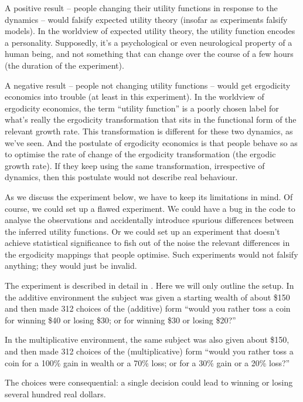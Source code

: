 A positive result -- people changing their utility functions in response to the dynamics -- would falsify 
expected utility theory (insofar as experiments falsify models). In the worldview of expected 
utility theory, the utility function encodes a personality. Supposedly, it's a psychological or 
even neurological property of a human being, and not something that can change over the 
course of a few hours (the duration of the experiment). 

A negative result -- people not changing utility functions -- would get ergodicity economics into trouble 
(at least in this experiment). In the worldview of ergodicity economics, the term ``utility function'' 
is a poorly chosen label for what's really the ergodicity transformation that sits in the functional 
form of the relevant growth rate. This transformation is different for these two dynamics, as we've 
seen. And the postulate of ergodicity economics is that people behave so as to optimise the 
rate of change of the ergodicity transformation (\ie the ergodic growth rate). If they keep using the 
same transformation, irrespective of dynamics, then this postulate would 
not describe real behaviour.

As we discuss the experiment below, we have to keep its limitations in mind. Of course, 
we could set up a flawed experiment. We could have a bug in the code to analyse the 
observations and accidentally introduce spurious differences between the inferred utility functions. 
Or we could set up an experiment that doesn't achieve statistical significance to fish out 
of the noise the relevant differences in the ergodicity mappings that people optimise. 
Such experiments would not falsify anything; they would just be invalid. 

The experiment is described in detail in \cite{MederETAL2019}. Here we will only outline the setup. 
In the additive environment the subject was given a starting wealth of about \$150 and then 
made 312 choices of the (additive) form ``would you rather toss a coin for winning \$40 or losing 
\$30; or for winning \$30 or losing \$20?'' 

In the multiplicative environment, the same subject was also given about \$150, and then made 
312 choices of the (multiplicative) form ``would you rather toss a coin for a 100\% gain in wealth 
or a 70\% loss; or for a 30\% gain or a 20\% loss?''

The choices were consequential: a single decision could lead to winning or losing several 
hundred real dollars. 

